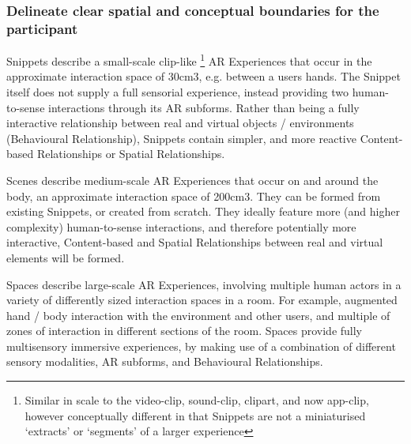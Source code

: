 \subsubsection{Delineate clear spatial and conceptual boundaries for the participant}
Snippets describe a small-scale clip-like \footnote{Similar in scale to the video-clip, sound-clip, clipart, and now app-clip, however conceptually different in that Snippets are not a miniaturised `extracts' or `segments' of a larger experience} AR Experiences that occur in the approximate interaction space of 30cm3, e.g. between a users hands. The Snippet itself does not supply a full sensorial experience, instead providing two human- to-sense interactions through its AR subforms. Rather than being a fully interactive relationship between real and virtual objects / environments (Behavioural Relationship), Snippets contain simpler, and more reactive Content-based Relationships or Spatial Relationships.

Scenes describe medium-scale AR Experiences that occur on and around the body, an approximate interaction space of 200cm3. They can be formed from existing Snippets, or created from scratch. They ideally feature more (and higher complexity) human-to-sense interactions, and therefore potentially more interactive, Content-based and Spatial Relationships between real and virtual elements will be formed.

Spaces describe large-scale AR Experiences, involving multiple human actors in a variety of differently sized interaction spaces in a room. For example, augmented hand / body interaction with the environment and other users, and multiple of zones of interaction in different sections of the room. Spaces provide fully multisensory immersive experiences, by making use of a combination of different sensory modalities, AR subforms, and Behavioural Relationships.



